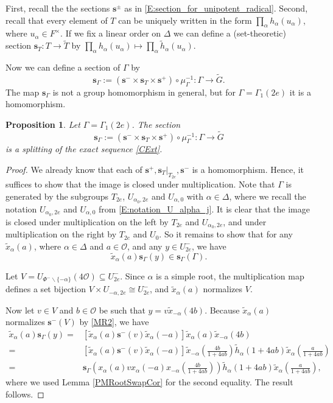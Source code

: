 \documentclass[10pt, letterpaper]{amsart}
\theoremstyle{plain}
\newtheorem{Prop}[equation]{Proposition}
\theoremstyle{definition}
\numberwithin{equation}{section}
\newcommand{\xt}{\tilde{x}}
\newcommand{\htt}{\tilde{h}}
\newcommand{\Gt}{\widetilde{G}}
\newcommand{\Tt}{\widetilde{T}}
\newcommand{\s}{\mathbf{s}}
\newcommand{\Ocal}{\mathcal{O}}
\begin{document}
First, recall the the sections $\s^{\pm}$ as in \eqref{E:section_for_unipotent_radical}. Second, recall that every element of $T$ can be uniquely written in the form $\prod_{\alpha}h_{\alpha}(u_{\alpha})$, where $u_{\alpha}\in F^{\times}$. If we fix a linear order on $\Delta$ we can define a (set-theoretic) section $\s_{T}:T\rightarrow \Tt$ by $\prod_{\alpha}h_{\alpha}(u_{\alpha})\mapsto \prod_{\alpha}\htt_{\alpha}(u_{\alpha})$.

Now we can define a section of $\Gamma$ by
\[
\s_{\Gamma}:=(\s^{-}\times \s_{T}\times \s^{+})\circ \mu_{\Gamma}^{-1}:\Gamma \rightarrow \Gt.
\]
The map $\s_{\Gamma}$ is not a group homomorphism in general, but for $\Gamma=\Gamma_{1}(2e)$ it is a homomorphism.
\begin{Prop}\label{Gamma12eSplitting}
	Let $\Gamma=\Gamma_{1}(2e)$. The section 
    \[
    \s_{\Gamma}:=(\s^{-}\times \s_{T}\times \s^{+})\circ \mu_{\Gamma}^{-1}:\Gamma \longrightarrow \Gt
    \]
    is a splitting of the exact sequence \eqref{CExt}.
\end{Prop}
\begin{proof}
    We already know that each of $\s^{+}, \s_{T}|_{T_{2e}}, \s^{-}$ is a homomorphism. Hence, it suffices to show that the image is closed under multiplication. Note that $\Gamma$ is generated by the subgroups $T_{2e}$, $U_{\alpha_{0},2e}$ and $U_{\alpha,0}$ with $\alpha\in \Delta$, where we recall the notation $U_{\alpha_{0},2e}$ and $U_{\alpha,0}$ from \eqref{E:notation_U_alpha_j}. It is clear that the image is closed under multiplication on the left by $T_{2e}$ and $U_{\alpha_{0},2e}$, and under multiplication on the right by $T_{2e}$ and $U_{0}$. So it remains to show that for any $\xt_{\alpha}(a)$, where $\alpha\in\Delta$ and $a\in\Ocal$, and any $y\in U^{-}_{2e}$, we have
	\begin{equation*}
		\xt_{\alpha}(a)\s_{\Gamma}(y)\in \s_{\Gamma}(\Gamma).
	\end{equation*}
	
	Let $V=U_{\Phi^{-}\smallsetminus\{-\alpha\}}(4\Ocal)\subseteq U^{-}_{2e}$. Since $\alpha$ is a simple root, the multiplication map defines a set bijection $V\times U_{-\alpha,2e}\cong U^{-}_{2e}$, and $\xt_{\alpha}(a)$ normalizes $V$. 
	
	Now let $v\in V$ and $b\in \Ocal$ be such that $y=v\xt_{-\alpha}(4b)$. Because $\xt_{\alpha}(a)$ normalizes $\s^{-}(V)$ by \eqref{MR2}, we have
	\begin{align*}
		\xt_{\alpha}(a)\s_{\Gamma}(y) =& [\xt_{\alpha}(a)\s^{-}(v)\xt_{\alpha}(-a)] \xt_{\alpha}(a)\xt_{-\alpha}(4b)\\
		=& [\xt_{\alpha}(a)\s^{-}(v)\xt_{\alpha}(-a)] \xt_{-\alpha}(\frac{4b}{1+4ab})\htt_{\alpha}(1+4ab)\xt_{\alpha}(\frac{a}{1+4ab})\\
		=& \s_{\Gamma}\left(x_{\alpha}(a)vx_{\alpha}(-a) x_{-\alpha}(\frac{4b}{1+4ab})\right)\htt_{\alpha}(1+4ab)\xt_{\alpha}(\frac{a}{1+4ab}),
	\end{align*}
    where we used Lemma \ref{PMRootSwapCor} for the second equality. The result follows.
\end{proof}
\end{document}

